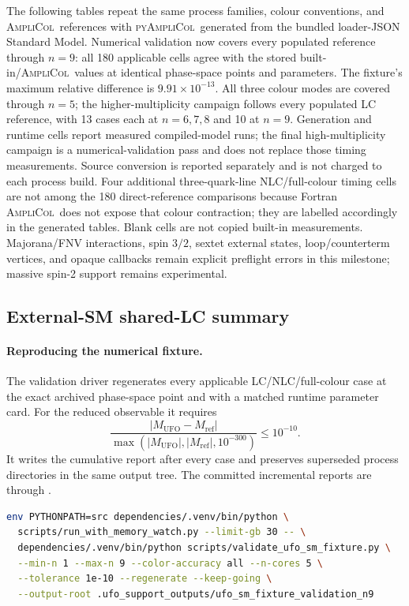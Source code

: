 \documentclass[10pt]{article}
\newcommand{\AC}{\textsc{AmpliCol}}
\newcommand{\PAC}{\textsc{pyAmpliCol}}
\begin{document}
\noindent\footnotesize The following tables repeat the same process families,
colour conventions, and \AC\ references with \PAC\ generated from the bundled
loader-JSON Standard Model.  Numerical validation now covers every populated
reference through \(n=9\): all 180 applicable cells agree with the stored
built-in/\AC\ values at identical phase-space points and parameters.  The
fixture's maximum relative difference is \(9.91\times10^{-13}\).  All three
colour modes are covered through \(n=5\); the higher-multiplicity campaign
follows every populated LC reference, with 13 cases each at \(n=6,7,8\) and 10
at \(n=9\).  Generation and runtime cells report measured compiled-model runs;
the final high-multiplicity campaign is a numerical-validation pass and does
not replace those timing measurements.  Source conversion is reported
separately and is not charged to each process build.  Four additional
three-quark-line NLC/full-colour timing cells are not among the 180
direct-reference comparisons because Fortran \AC\ does not expose that colour
contraction; they are labelled accordingly in the generated tables.
Blank cells are not copied built-in measurements.  Majorana/FNV interactions,
spin $3/2$, sextet external states, loop/counterterm vertices, and opaque
callbacks remain explicit preflight errors in this milestone; massive spin-2
support remains experimental.
\par\smallskip

\subsection*{External-SM shared-LC summary}

\paragraph{Reproducing the numerical fixture.}
The validation driver regenerates every applicable LC/NLC/full-colour case at
the exact archived phase-space point and with a matched runtime parameter card.
For the reduced observable it requires
\[
  \frac{|M_{\mathrm{UFO}}-M_{\mathrm{ref}}|}
       {\max(|M_{\mathrm{UFO}}|,|M_{\mathrm{ref}}|,10^{-300})}
  \leq 10^{-10}.
\]
It writes the cumulative report after every case and preserves superseded
process directories in the same output tree.  The committed incremental reports
are  through
.
\begin{lstlisting}[language=bash,basicstyle=\ttfamily\scriptsize,breaklines=true,breakatwhitespace=true]
env PYTHONPATH=src dependencies/.venv/bin/python \
  scripts/run_with_memory_watch.py --limit-gb 30 -- \
  dependencies/.venv/bin/python scripts/validate_ufo_sm_fixture.py \
  --min-n 1 --max-n 9 --color-accuracy all --n-cores 5 \
  --tolerance 1e-10 --regenerate --keep-going \
  --output-root .ufo_support_outputs/ufo_sm_fixture_validation_n9
\end{lstlisting}




\end{document}
